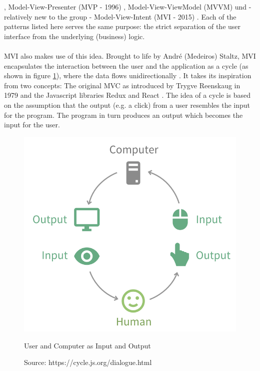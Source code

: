 \cite{theModelViewEditorTrygveReenskaug1979,modelsViewsControllersTrygveReenskaug1979,aDescriptionOfTheModelViewControllerGlennE1988,professionalASPNETMVC52014}, 
Model-View-Presenter (MVP - 1996) 
\cite{mVPModelViewPresenterTheTaligentMikePotel1996,modelViewPresenterMartinFowler2006,proAspNetMVC3FrameworkModelViewPresenter2011},
Model-View-ViewModel (MVVM) 
\cite{introductionToModelViewModelPatternJohnGossman2005, modelViewViewModelDesignPatternUsingWindowsErikSorenson2010,proAspNetMVC3FrameworkModelViewPresenter2011}
und - relatively new to the group - Model-View-Intent (MVI - 2015) 
\cite{whatIfTheUserWasAFunctionYoutubeAndreStaltzUserFunction2015,reactiveProgrammingWithRxJSMVISergiMansilla,modelViewIntentOnAndroidHannesDorfmann2016}. 
Each of the patterns listed here serves the same purpose: the strict separation of the user interface from the underlying (business) logic.
\\
\\
MVI also makes use of this idea. Brought to life by André (Medeiros) Staltz, MVI encapsulates the interaction between the user and the application as a cycle 
(as shown in figure 
\ref{fig:userComputerInputOutput}), 
where the data flows unidirectionally 
\cite{unidirectionalDataFlowRedux}.
It takes its inspiration from two concepts: The original MVC as introduced by Trygve Reenskaug in 1979
\cite{theModelViewEditorTrygveReenskaug1979}
and the Javascript libraries Redux 
\cite{redux} 
and React 
\cite{react}. 
The idea of a cycle is based on the assumption that the output (e.g. a click) from a user resembles the input for the program. The program in turn produces an output 
which becomes the input for the user.
\begin{figure}[ht]
    \centering
    \includegraphics[height=0.5\textwidth]{./images/mvi-cycle}
    \caption{User and Computer as Input and Output}
    \caption*{Source: https://cycle.js.org/dialogue.html}
    \label{fig:userComputerInputOutput}
\end{figure}

